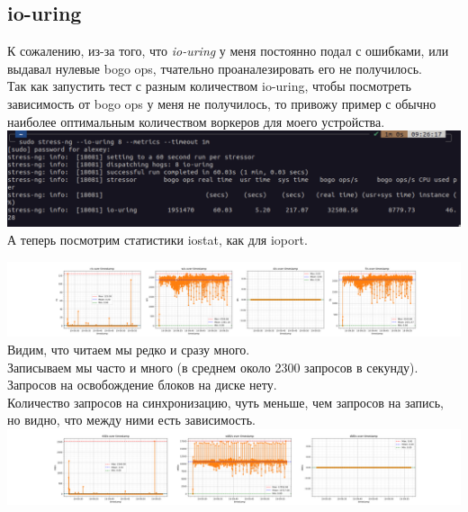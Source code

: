 \subsection{io-uring}
К сожалению, из-за того, что \textit{io-uring} у меня постоянно подал с ошибками, или выдавал нулевые bogo ops, тчательно проаналезировать его не получилось.\\
Так как запустить тест с разным количеством io-uring, чтобы посмотреть зависимость от bogo ops у меня не получилось, то привожу пример с обычно наиболее оптимальным количеством воркеров для моего устройства.\\
\includegraphics[width=\textwidth]{./io/image/io-uring_test.png}
А теперь посмотрим статистики iostat, как для ioport.

\includegraphics[width=\textwidth]{./io/image/io-uring_1.png}
Видим, что читаем мы редко и сразу много. \\
Записываем мы часто и много (в среднем около 2300 запросов в секунду).\\
Запросов на освобождение блоков на диске нету. \\
Количество запросов на синхронизацию, чуть меньше, чем запросов на запись, но видно, что между ними есть зависимость.\\
\includegraphics[width=\textwidth]{./io/image/io-uring_2.png}
